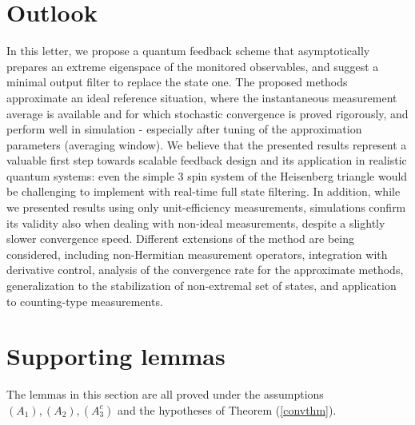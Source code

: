 \documentclass[conference]{IEEEtran}
\theoremstyle{plain}
\theoremstyle{plain}
\theoremstyle{plain}
\theoremstyle{plain}
\theoremstyle{remark}
\theoremstyle{definition}
\begin{document}
\section{Outlook} In this letter, we propose a quantum feedback scheme that asymptotically prepares an extreme eigenspace of the monitored observables, and suggest a minimal output filter to replace the state one.
The proposed methods approximate an ideal reference situation, where the instantaneous measurement average is available and for which stochastic convergence is proved rigorously, and perform well in simulation - especially after tuning of the approximation parameters (averaging window). We believe that the presented results represent a valuable first step towards scalable feedback design and its application in realistic quantum systems: even the simple 3 spin system of the Heisenberg triangle would be challenging to implement with real-time full state filtering.  In addition, while we presented results using only unit-efficiency measurements, simulations confirm its validity also when dealing with non-ideal measurements, despite a slightly slower convergence speed.
Different extensions of the method are being considered, including non-Hermitian measurement operators, integration with derivative control, analysis of the convergence rate for the approximate methods, generalization to the stabilization of non-extremal set of states, and application to counting-type measurements.

\appendix
\section{Supporting lemmas}
\label{app}
The lemmas in this section are all proved under the assumptions $(A_1), (A_2), (A_3^c)$ and the hypotheses of Theorem (\ref{convthm}).
\end{document}
